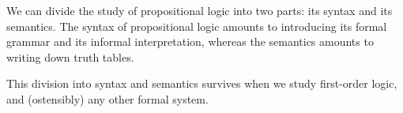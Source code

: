 \begin{node}\label{prop-000H}%
We can divide the study of propositional logic into two parts: its
syntax and its semantics. The syntax of propositional logic amounts to
introducing its formal grammar and its informal interpretation, whereas
the semantics amounts to writing down truth tables.

This division into syntax and semantics survives when we study
first-order logic, and (ostensibly) any other formal system.
\end{node}

